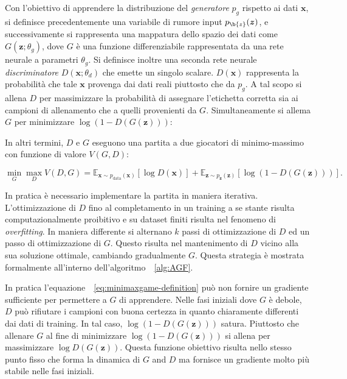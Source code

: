 Con l'obiettivo di apprendere la distribuzione del \textit{generatore} $p_g$ rispetto ai dati $\bm{x}$, si definisce precedentemente una variabile di rumore input  $p_{\b{z}}(\bm{z})$, e successivamente si rappresenta una mappatura dello spazio dei dati come $G(\bm{z}; \theta_g)$, dove $G$ è una funzione differenziabile rappresentata da una rete neurale a parametri $\theta_g$. Si definisce inoltre una seconda rete neurale \textit{discriminatore}
 $D(\bm{x}; \theta_d)$ che emette un singolo scalare. $D(\bm{x})$ rappresenta la probabilità che tale $\bm{x}$ provenga dai dati reali piuttosto che da $p_g$. 
A tal scopo si allena $D$ per massimizzare la probabilità di assegnare l'etichetta corretta sia ai campioni di allenamento che a quelli provenienti da $G$.
Simultaneamente si allema $G$ per minimizzare $\log(1-D(G(\bm{z})))$:

In altri termini, $D$ e $G$ eseguono una partita a due giocatori di minimo-massimo con funzione di valore $V(G, D)$: 

\begin{equation}
\label{eq:minimaxgame-definition}
\min_G \max_D V(D, G) = \mathbb{E}_{\bm{x} \sim p_{\text{data}}(\bm{x})}[\log D(\bm{x})] + \mathbb{E}_{\bm{z} \sim p_{\bm{z}}(\bm{z})}[\log (1 - D(G(\bm{z})))].
\end{equation}

In pratica è necessario implementare la partita in maniera iterativa. L'ottimizzazione di $D$ fino al completamento in un training a se stante risulta computazionalmente proibitivo e su dataset finiti risulta nel fenomeno di \textit{overfitting}. In maniera differente si alternano $k$ passi di ottimizzazione di $D$ ed un passo di ottimizzazione di $G$. Questo risulta nel mantenimento di $D$ vicino alla sua soluzione ottimale, cambiando gradualmente $G$. Questa strategia è mostrata formalmente all'interno dell'algoritmo~~\ref{alg:AGF}.

In pratica l'equazione~~\ref{eq:minimaxgame-definition} può non fornire un gradiente sufficiente per permettere a $G$ di apprendere. Nelle fasi iniziali dove $G$ è debole, $D$ può rifiutare i campioni con buona certezza in quanto chiaramente differenti dai dati di training. In tal caso, $\log ( 1- D(G(\bm{z})))$ satura. Piuttosto che allenare $G$ al fine di minimizzare $\log (1 - D(G(\bm{z})))$ si allena per massimizzare $\log D(G(\bm{z}))$. 
Questa funzione obiettivo risulta nello stesso punto fisso che forma la dinamica di $G$ and $D$ ma fornisce un gradiente molto più stabile nelle fasi iniziali.

